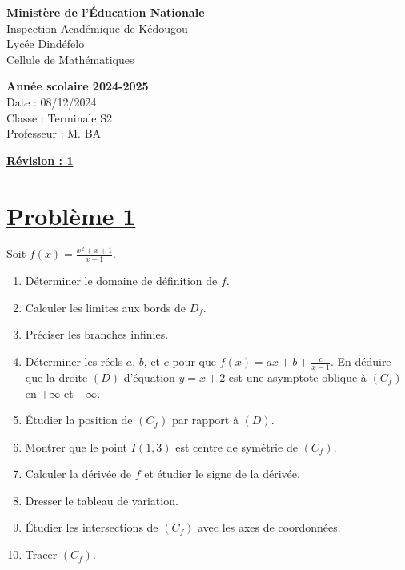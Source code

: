 \documentclass[12pt]{article}
\begin{document}
\noindent
\begin{minipage}[t]{0.48\textwidth}
\raggedright
\textbf{Ministère de l'Éducation Nationale}\\
Inspection Académique de Kédougou\\
Lycée Dindéfelo\\
Cellule de Mathématiques
\end{minipage}
\hfill
\begin{minipage}[t]{0.48\textwidth}
\raggedleft
\textbf{Année scolaire 2024-2025}\\
Date : 08/12/2024\\
Classe : Terminale S2\\
Professeur : M. BA
\end{minipage}

\vspace{1cm}

\begin{center}
\textbf{\underline{Révision : 1}}
\end{center}

\section*{\underline{Problème 1}}
Soit \( f(x) = \frac{x^2 + x + 1}{x - 1} \).
\begin{enumerate}
    \item Déterminer le domaine de définition de \( f \).
    \item Calculer les limites aux bords de \( D_f \).
    \item Préciser les branches infinies.
    \item Déterminer les réels \( a \), \( b \), et \( c \) pour que \( f(x) = ax + b + \frac{c}{x - 1} \). En déduire que la droite \( (D) \) d'équation \( y = x + 2 \) est une asymptote oblique à \( (C_f) \) en \( +\infty \) et \( -\infty \).
    \item Étudier la position de \( (C_f) \) par rapport à \( (D) \).
    \item Montrer que le point \( I(1, 3) \) est centre de symétrie de \( (C_f) \).
    \item Calculer la dérivée de \( f \) et étudier le signe de la dérivée.
    \item Dresser le tableau de variation.
    \item Étudier les intersections de \( (C_f) \) avec les axes de coordonnées.
    \item Tracer \( (C_f) \).
\end{enumerate}
\end{document}
